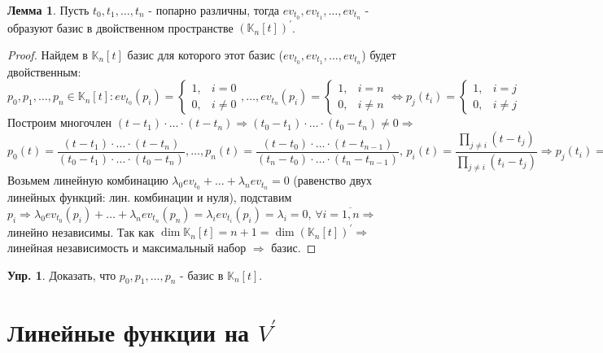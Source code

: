 \documentclass[12pt]{article}
\theoremstyle{definition}
\newtheorem{exrc}{Упр.}
\newtheorem{lemma}{Лемма}
\begin{document}
\begin{lemma}
	Пусть $t_0, t_1, \dotsc, t_n$ - попарно различны, тогда $ev_{t_0}, ev_{t_1}, \dotsc, ev_{t_n}$ - образуют базис в двойственном пространстве $(\mathbb{K}_n[t])^\prime$.
\end{lemma}
\begin{proof}
	Найдем в $\mathbb{K}_n[t]$ базис для которого этот базис ($ev_{t_0}, ev_{t_1}, \dotsc, ev_{t_n}$) будет двойственным:
	$$
		p_0, p_1, \dotsc, p_n \in \mathbb{K}_n[t]\colon ev_{t_0}(p_i) = \begin{cases} 1,& i = 0\\ 0, & i \neq 0 \end{cases}, \dotsc, ev_{t_n}(p_i) = \begin{cases} 1,& i = n\\ 0, & i \neq n \end{cases} \Leftrightarrow p_j(t_i) = \begin{cases} 1, & i = j\\ 0, &  i \neq j \end{cases}
	$$
	Построим многочлен $(t - t_1){\cdot} \dotsc {\cdot}(t - t_n) \Rightarrow (t_0 - t_1){\cdot}\dotsc{\cdot}(t_0 - t_n) \neq 0 \Rightarrow$ 
	$$
		p_0(t) = \dfrac{(t-t_1){\cdot}\dotsc{\cdot}(t-t_n)}{(t_0 - t_1){\cdot}\dotsc{\cdot}(t_0 - t_n)}, \dotsc, p_n(t) = \dfrac{(t-t_0){\cdot}\dotsc{\cdot}(t-t_{n-1})}{(t_n - t_0){\cdot}\dotsc{\cdot}(t_n - t_{n-1})}, \, p_i(t) = \dfrac{\prod\limits_{j \neq i}(t-t_j)}{\prod\limits_{j \neq i}(t_i-t_j)} \Rightarrow p_j(t_i) = \begin{cases} 1,& i = j\\ 0, & i \neq j \end{cases}
	$$
	Возьмем линейную комбинацию $\lambda_0 ev_{t_0} + \dotsc + \lambda_n ev_{t_n} = 0$ (равенство двух линейных функций: лин. комбинации и нуля), подставим $p_i \Rightarrow \lambda_0 ev_{t_0}(p_i) + \dotsc + \lambda_n ev_{t_n}(p_n) = \lambda_i ev_{t_i}(p_i) = \lambda_i = 0, \, \forall i = \overline{1,n} \Rightarrow$ линейно независимы.
	Так как $\dim{\mathbb{K}_n[t]} = n+1 = \dim{(\mathbb{K}_n[t])^\prime} \Rightarrow$ линейная независимость и максимальный набор $\Rightarrow$ базис.
\end{proof}
\begin{exrc}
	Доказать, что $p_0, p_1, \dotsc, p_n$ - базис в $\mathbb{K}_n[t]$.
\end{exrc}
\section*{Линейные функции на $V^\prime$}
\end{document}
